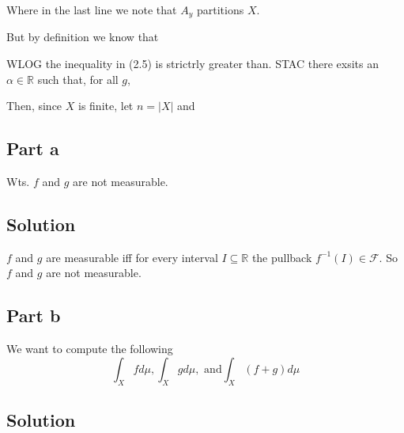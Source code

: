 Where in the last line we note that $A_y$ partitions $X$.

But by definition we know that

WLOG the inequality in (2.5) is strictrly greater than. STAC there exsits an $\alpha \in \mathbb{R}$ such that, for all $g$,

Then, since $X$ is finite, let $n = |X|$ and

\subsection*{Part a}
Wts. $f$ and $g$ are not measurable.
\subsection*{Solution}
$f$ and $g$ are measurable iff for every interval $I \subseteq \mathbb{R}$ the pullback $f^{-1}(I) \in \mathcal{F}$.
So $f$ and $g$ are not measurable.

\subsection*{Part b}
We want to compute the following
$$\int_X f d\mu, \int_X g d\mu, \textrm{ and} \int_X(f+g)d\mu$$

\subsection*{Solution}

